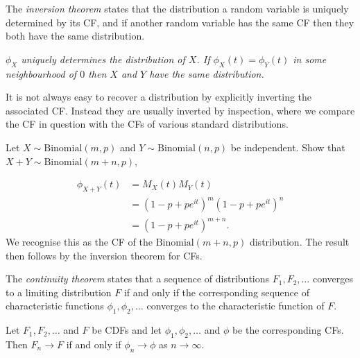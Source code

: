 The \emph{inversion theorem} states that the distribution a random variable is uniquely determined by its CF, and if another random variable has the same CF then they both have the same distribution. 

\begin{theorem}
\ben
\it $\phi_X$ uniquely determines the distribution of $X$.
\it If $\phi_X(t) = \phi_Y(t)$ in some neighbourhood of $0$ then $X$ and $Y$ have the same distribution.
\een
\end{theorem}

It is not always easy to recover a distribution by explicitly inverting the associated CF. Instead they are usually inverted by inspection, where we compare the CF in question with the CFs of various standard distributions.

\begin{example}
Let $X\sim\text{Binomial}(m,p)$ and $Y\sim\text{Binomial}(n,p)$ be independent. Show that $X+Y\sim\text{Binomial}(m+n,p)$,
\begin{solution}
\begin{align*}
\phi_{X+Y}(t) 	
	& = M_X(t)M_Y(t) \\
	& = (1-p+pe^{it})^m (1-p+pe^{it})^n \\
	& = (1-p+pe^{it})^{m+n}.
\end{align*}
We recognise this as the CF of the $\text{Binomial}(m+n,p)$ distribution. The result then follows by the inversion theorem for CFs.
\end{solution}
\end{example}

The \emph{continuity theorem} states that a sequence of distributions $F_1,F_2,\ldots$ converges to a limiting distribution $F$ if and only if the corresponding sequence of characteristic functions $\phi_1,\phi_2,\ldots$ converges to the characteristic function of $F$.


\begin{theorem}
Let $F_1,F_2,\ldots$ and $F$ be CDFs and let $\phi_1,\phi_2,\ldots$ and $\phi$ be the corresponding CFs. 
Then $F_n\to F$ if and only if $\phi_n\to\phi$ as $n\to\infty$.
\end{theorem}




